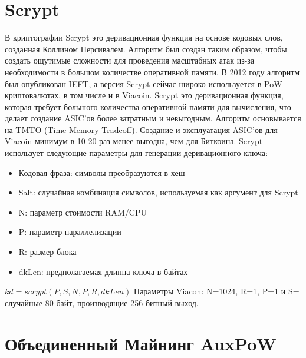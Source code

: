 \documentclass{article}
\begin{document}
\section{Scrypt}\label{sec: Scrypt}
В криптографии \cite{scrypt} Scrypt это деривационная функция на основе кодовых слов,
созданная Коллином Персивалем. Алгоритм был создан таким образом, чтобы
создать ощутимые сложности для проведения масштабных атак из-за необходимости в
большом количестве оперативной памяти. В 2012 году алгоритм был опубликован IEFT, а версия Scrypt сейчас широко
используется в PoW криптовалютах, в том числе и в Viacoin.
\newline \newline \noindent
Scrypt это деривационная функция, которая требует большого количества оперативной
памяти для вычисления, что делает создание ASIC'ов более затратным и невыгодным.
Алгоритм основывается на TMTO (Time-Memory Tradeoff). Создание и эксплуатация
ASIC'ов для Viacoin минимум в 10-20 раз менее выгодна, чем для Биткоина.
\newline \newline \noindent
Scrypt использует следующие параметры для генерации деривационного ключа:
\begin{itemize}
\item Кодовая фраза: символы преобразуются в хеш
\item Salt: случайная комбинация символов, используемая как аргумент для Scrypt
\item N: параметр стоимости RAM/CPU
\item P: параметр параллелизации
\item R: размер блока
\item dkLen: предполагаемая длинна ключа в байтах
\end{itemize}
$kd = scrypt(P, S, N, P, R, dkLen)$
\newline \newline \noindent
Параметры Viacon: N=1024, R=1, P=1 и S= случайные 80 байт, производящие 256-битный выход.

\section{Объединенный Майнинг AuxPoW}\label{sec:Merged Mining AuxPoW}
\end{document}
